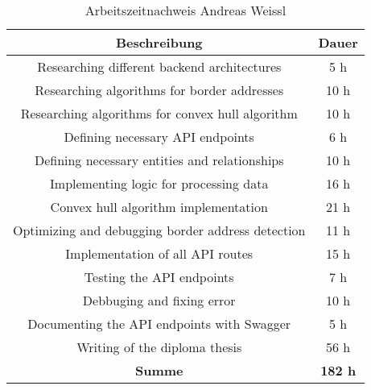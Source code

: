 \begin{table}[h!]
  \centering
  \begin{tabular}{|c|c|}
  \hline
  \multicolumn{1}{|c|}{\textbf{Beschreibung}}  &
  \multicolumn{1}{c|}{\textbf{Dauer}}  \\ \hline
    Researching different backend architectures & 5 h \\ \hline
    Researching algorithms for border addresses & 10 h \\ \hline
    Researching algorithms for convex hull algorithm & 10 h \\ \hline
    Defining necessary API endpoints & 6 h \\ \hline
    Defining necessary entities and relationships & 10 h \\ \hline
    Implementing logic for processing data & 16 h \\ \hline
    Convex hull algorithm implementation & 21 h \\ \hline
    Optimizing and debugging border address detection & 11 h \\ \hline
    Implementation of all API routes & 15 h \\ \hline
    Testing the API endpoints & 7 h \\ \hline
    Debbuging and fixing error & 10 h \\ \hline
    Documenting the API endpoints with Swagger & 5 h \\ \hline
    Writing of the diploma thesis & 56 h \\ \hline
    {\textbf{Summe}} & \textbf{182 h} \\ \hline
   \end{tabular}
  \caption{Arbeitszeitnachweis Andreas Weissl}
  \end{table}

\newpage




